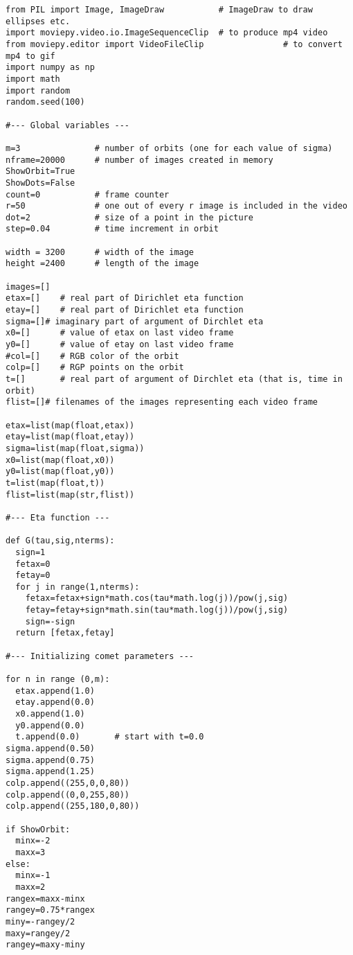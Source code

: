 \documentclass[oneside,10pt]{book}
\begin{document}
\begin{lstlisting}
from PIL import Image, ImageDraw           # ImageDraw to draw ellipses etc.
import moviepy.video.io.ImageSequenceClip  # to produce mp4 video
from moviepy.editor import VideoFileClip                # to convert mp4 to gif
import numpy as np
import math
import random
random.seed(100)

#--- Global variables ---

m=3               # number of orbits (one for each value of sigma)
nframe=20000      # number of images created in memory
ShowOrbit=True
ShowDots=False
count=0           # frame counter
r=50              # one out of every r image is included in the video
dot=2             # size of a point in the picture
step=0.04         # time increment in orbit

width = 3200      # width of the image
height =2400      # length of the image

images=[]
etax=[]    # real part of Dirichlet eta function
etay=[]    # real part of Dirichlet eta function
sigma=[]# imaginary part of argument of Dirchlet eta
x0=[]      # value of etax on last video frame
y0=[]      # value of etay on last video frame
#col=[]    # RGB color of the orbit
colp=[]    # RGP points on the orbit
t=[]       # real part of argument of Dirchlet eta (that is, time in orbit)
flist=[]# filenames of the images representing each video frame

etax=list(map(float,etax))
etay=list(map(float,etay))
sigma=list(map(float,sigma))
x0=list(map(float,x0))
y0=list(map(float,y0))
t=list(map(float,t))
flist=list(map(str,flist))

#--- Eta function ---

def G(tau,sig,nterms):
  sign=1
  fetax=0
  fetay=0
  for j in range(1,nterms):
    fetax=fetax+sign*math.cos(tau*math.log(j))/pow(j,sig)
    fetay=fetay+sign*math.sin(tau*math.log(j))/pow(j,sig)
    sign=-sign
  return [fetax,fetay]

#--- Initializing comet parameters ---

for n in range (0,m):
  etax.append(1.0)
  etay.append(0.0)
  x0.append(1.0)
  y0.append(0.0)
  t.append(0.0)       # start with t=0.0
sigma.append(0.50)
sigma.append(0.75)
sigma.append(1.25)
colp.append((255,0,0,80))
colp.append((0,0,255,80))
colp.append((255,180,0,80))

if ShowOrbit:
  minx=-2
  maxx=3
else:
  minx=-1
  maxx=2
rangex=maxx-minx
rangey=0.75*rangex
miny=-rangey/2
maxy=rangey/2
rangey=maxy-miny


\end{lstlisting}
\end{document}
